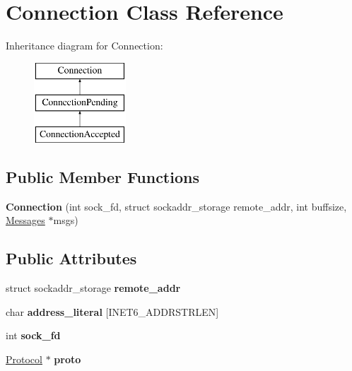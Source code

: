 \hypertarget{class_connection}{
\section{Connection Class Reference}
\label{class_connection}
}
Inheritance diagram for Connection:\begin{figure}[H]
\begin{center}
\leavevmode
\includegraphics[height=3.000000cm]{class_connection}
\end{center}
\end{figure}
\subsection*{Public Member Functions}
\begin{DoxyCompactItemize}
\item 
\hypertarget{class_connection_a59ac09cacc53b2ed1f5e544892271da3}{
{\bfseries Connection} (int sock\_\-fd, struct sockaddr\_\-storage remote\_\-addr, int buffsize, \hyperlink{class_messages}{Messages} $\ast$msgs)}
\label{class_connection_a59ac09cacc53b2ed1f5e544892271da3}

\end{DoxyCompactItemize}
\subsection*{Public Attributes}
\begin{DoxyCompactItemize}
\item 
\hypertarget{class_connection_af9042dc7286458dbc9655d836edb20e0}{
struct sockaddr\_\-storage {\bfseries remote\_\-addr}}
\label{class_connection_af9042dc7286458dbc9655d836edb20e0}

\item 
\hypertarget{class_connection_a0e2ae0f93aa1dcf12bae2bb0eadd28e2}{
char {\bfseries address\_\-literal} \mbox{[}INET6\_\-ADDRSTRLEN\mbox{]}}
\label{class_connection_a0e2ae0f93aa1dcf12bae2bb0eadd28e2}

\item 
\hypertarget{class_connection_a45198e52d812d771dd32487dcf8a4003}{
int {\bfseries sock\_\-fd}}
\label{class_connection_a45198e52d812d771dd32487dcf8a4003}

\item 
\hypertarget{class_connection_abe79c3f0728a2090117e486fa9af66fb}{
\hyperlink{class_protocol}{Protocol} $\ast$ {\bfseries proto}}
\label{class_connection_abe79c3f0728a2090117e486fa9af66fb}

\end{DoxyCompactItemize}


